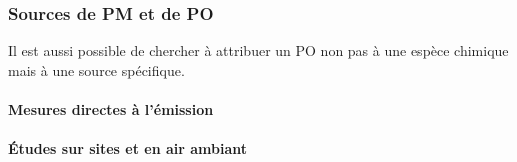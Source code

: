 

\subsubsection{Sources de PM et de PO}%
\label{ssub:sources_de_pm_et_de_po}


Il est aussi possible de chercher à attribuer un PO non pas à une espèce chimique mais à
une source spécifique.

\paragraph{Mesures directes à l'émission}%
\label{par:mesures_directes_à_l_émission}


\paragraph{Études sur sites et en air ambiant}%
\label{par:études_sur_sites_et_en_air_ambiant}

